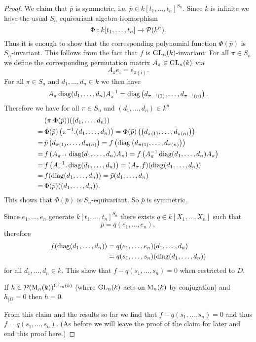 \begin{proof}
 We claim that $\bar{p}$ is symmetric, i.e. $\bar{p} \in k[t_1, \ldots, t_n]^{S_n}$. Since $k$ is infinite we have the usual $S_n$-equivariant algebra isomorphism
 \[
 \Phi: k[t_1, \ldots, t_n] \to \mathcal{P}(k^n).
 \]
 Thus it is enough to show that the corresponding polynomial function $\Phi(\bar{p})$ is $S_n$-invariant. This follows from the fact that $f$ is $\operatorname{GL}_n(k)$-invariant: For all $\pi \in S_n$ we define the corresponding permutation matrix $A_\pi \in \operatorname{GL}_n(k)$ via
 \[
  A_\pi e_i = e_{\pi(i)}.
 \]
 For all $\pi \in S_n$ and $d_1, \ldots, d_n \in k$ we then have
 \[
  A_\pi \operatorname{diag}(d_1, \ldots, d_n) A_\pi^{-1}
  = \operatorname{diag}\left(d_{\pi^{-1}(1)}, \ldots, d_{\pi^{-1}(n)}\right).
 \]
 Therefore we have for all $\pi \in S_n$ and $(d_1, \ldots, d_n) \in k^n$
 \begin{align*}
  &\,(\pi.\Phi(\bar{p}))((d_1, \ldots, d_n)) \\
  =&\, \Phi(\bar{p})\left(\pi^{-1}.(d_1, \ldots, d_n)\right)
  = \Phi(\bar{p})\left(\left(d_{\pi(1)}, \ldots, d_{\pi(n)}\right)\right) \\
  =&\, \bar{p}\left(d_{\pi(1)}, \ldots, d_{\pi(n)}\right)
  = f\left(\operatorname{diag}\left(d_{\pi(1)}, \ldots, d_{\pi(n)}\right)\right) \\
  =&\, f\left(A_{\pi^{-1}} \operatorname{diag}(d_1, \ldots, d_n) A_\pi\right)
  = f\left(A_\pi^{-1} \operatorname{diag}(d_1, \ldots, d_n) A_\pi\right) \\
  =&\, f\left(A_\pi^{-1}.\operatorname{diag}(d_1, \ldots, d_n)\right)
  = (A_\pi.f)(\operatorname{diag}(d_1, \ldots, d_n)) \\
  =&\, f(\operatorname{diag}(d_1, \ldots, d_n))
  = \bar{p}(d_1, \ldots, d_n) \\
  =&\, \Phi(\bar{p})((d_1, \ldots, d_n)).
 \end{align*}
 This shows that $\Phi(\bar{p})$ is $S_n$-equivariant. So $\bar{p}$ is symmetric.
 
 Since $e_1, \ldots, e_n$ generate $k[t_1, \ldots, t_n]^{S_n}$ there exists $q \in k[X_1, \ldots, X_n]$ such that
 \[
  \bar{p} = q(e_1, \ldots, e_n),
 \]
 therefore
 \begin{align*}
  f(\operatorname{diag}(d_1, \ldots, d_n))
  &= q(e_1, \ldots, e_n)(d_1, \ldots, d_n) \\
  &= q(s_1, \ldots, s_n)(\operatorname{diag}(d_1, \ldots, d_n))
 \end{align*}
 for all $d_1, \ldots, d_n \in k$. This show that $f-q(s_1, \ldots, s_n) = 0$ when restricted to $D$.
 
 \begin{claim}
  If $h \in \mathcal{P}(\operatorname{M}_n(k))^{\operatorname{GL}_n(k)}$ (where $\operatorname{GL}_n(k)$ acts on $\operatorname{M}_n(k)$ by conjugation) and $h_{|D} = 0$ then $h = 0$.
 \end{claim}

 From this claim and the results so far we find that $f - q(s_1, \ldots, s_n) = 0$ and thus $f = q(s_1, \ldots, s_n)$. (As before we will leave the proof of the claim for later and end this proof here.)
\end{proof}


